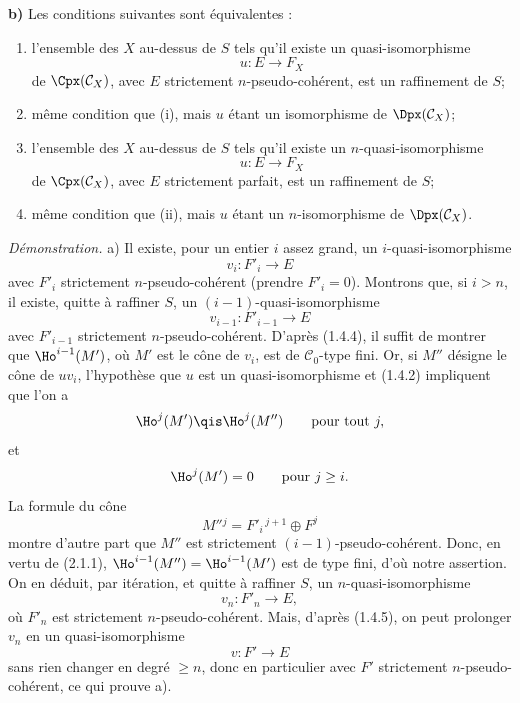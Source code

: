 \documentclass[11pt]{article}
\begin{document}
\textbf{b)} Les conditions suivantes sont équivalentes :
\begin{enumerate}[label=(\roman*)]
\item l'ensemble des \(X\) au-dessus de \(S\) tels qu'il existe un quasi-isomorphisme
\[
  u:E\longrightarrow F_X
\]
de \(\Cpx(\mathcal C_X)\), avec \(E\) strictement \(n\)-pseudo-cohérent, est un raffinement de \(S\);
\item[\((\mathrm{i}')\)] même condition que (i), mais \(u\) étant un isomorphisme de \(\Dpx(\mathcal C_X)\);
\item l'ensemble des \(X\) au-dessus de \(S\) tels qu'il existe un \(n\)-quasi-isomorphisme
\[
  u:E\longrightarrow F_X
\]
de \(\Cpx(\mathcal C_X)\), avec \(E\) strictement parfait, est un raffinement de \(S\);
\item[\((\mathrm{ii}')\)] même condition que (ii), mais \(u\) étant un \(n\)-isomorphisme de \(\Dpx(\mathcal C_X)\).
\end{enumerate}

\emph{Démonstration.} a) Il existe, pour un entier \(i\) assez grand, un \(i\)-quasi-isomorphisme
\[
  v_i:F'_i\longrightarrow E
\]
avec \(F'_i\) strictement \(n\)-pseudo-cohérent (prendre \(F'_i=0\)). Montrons que, si \(i>n\), il existe, quitte à raffiner \(S\), un \((i-1)\)-quasi-isomorphisme
\[
  v_{i-1}:F'_{i-1}\longrightarrow E
\]
avec \(F'_{i-1}\) strictement \(n\)-pseudo-cohérent. D'après (1.4.4), il suffit de montrer que \(\Ho^{i-1}(M')\), où \(M'\) est le cône de \(v_i\), est de \(\mathcal C_0\)-type fini. Or, si \(M''\) désigne le cône de \(uv_i\), l'hypothèse que \(u\) est un quasi-isomorphisme et (1.4.2) impliquent que l'on a
\[
  \Ho^j(M')\qis \Ho^j(M'')\qquad\text{pour tout }j,
\]
et
\[
  \Ho^j(M')=0\qquad\text{pour }j\geq i.
\]
La formule du cône
\[
  M''{}^j=F'_i{}^{\,j+1}\oplus F^j
\]
montre d'autre part que \(M''\) est strictement \((i-1)\)-pseudo-cohérent. Donc, en vertu de (2.1.1), \(\Ho^{i-1}(M'')=\Ho^{i-1}(M')\) est de type fini, d'où notre assertion. On en déduit, par itération, et quitte à raffiner \(S\), un \(n\)-quasi-isomorphisme
\[
  v_n:F'_n\longrightarrow E,
\]
où \(F'_n\) est strictement \(n\)-pseudo-cohérent. Mais, d'après (1.4.5), on peut prolonger \(v_n\) en un quasi-isomorphisme
\[
  v:F'\longrightarrow E
\]
sans rien changer en degré \(\geq n\), donc en particulier avec \(F'\) strictement \(n\)-pseudo-cohérent, ce qui prouve a).
\end{document}
